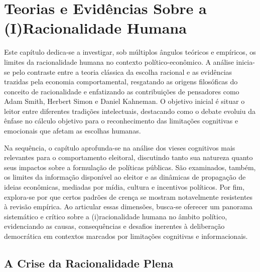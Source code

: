 \chapter{Teorias e Evidências Sobre a (I)Racionalidade Humana} %


Este capítulo dedica-se a investigar, sob múltiplos ângulos teóricos e empíricos, os limites da racionalidade humana no contexto político-econômico. A análise inicia-se pelo contraste entre a teoria clássica da escolha racional e as evidências trazidas pela economia comportamental, resgatando as origens filosóficas do conceito de racionalidade e enfatizando as contribuições de pensadores como Adam Smith, Herbert Simon e Daniel Kahneman. O objetivo inicial é situar o leitor entre diferentes tradições intelectuais, destacando como o debate evoluiu da ênfase no cálculo objetivo para o reconhecimento das limitações cognitivas e emocionais que afetam as escolhas humanas.

Na sequência, o capítulo aprofunda-se na análise dos vieses cognitivos mais relevantes para o comportamento eleitoral, discutindo tanto sua natureza quanto seus impactos sobre a formulação de políticas públicas. São examinados, também, os limites da informação disponível ao eleitor e as dinâmicas de propagação de ideias econômicas, mediadas por mídia, cultura e incentivos políticos. Por fim, explora-se por que certos padrões de crença se mostram notavelmente resistentes à revisão empírica. Ao articular essas dimensões, busca-se oferecer um panorama sistemático e crítico sobre a (i)racionalidade humana no âmbito político, evidenciando as causas, consequências e desafios inerentes à deliberação democrática em contextos marcados por limitações cognitivas e informacionais.

\section{A Crise da Racionalidade Plena} %

